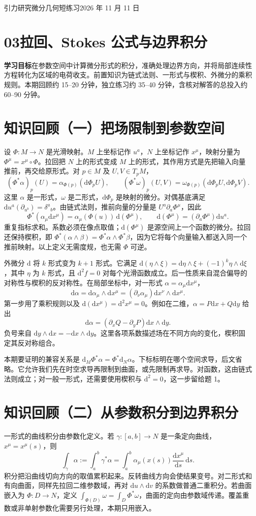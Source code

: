 \documentclass[11pt,a4paper]{article}
\newcommand{\D}{\mathrm d}
\newcommand{\head}[1]{\section*{\color{teal}#1}}
\begin{document}
{\large 引力研究微分几何短练习\hfill 2026 年 11 月 11 日}
\head{03\quad 拉回、Stokes 公式与边界积分}
\textbf{学习目标}\quad 在参数空间中计算微分形式的积分，准确处理边界方向，并将局部连续性方程转化为区域的电荷收支。前置知识为链式法则、一形式与楔积、外微分的乘积规则。本期回顾约 15--20 分钟，独立练习约 35--40 分钟，含核对解答的总投入约 60--90 分钟。

\head{知识回顾（一）\quad 把场限制到参数空间}
设 $\Phi:M\to N$ 是光滑映射。$M$ 上坐标记作 $u^a$，$N$ 上坐标记作 $x^\mu$，映射分量为 $\Phi^\mu=x^\mu\circ\Phi$。拉回把 $N$ 上的形式变成 $M$ 上的形式，其作用方式是先把输入向量推前，再交给原形式。对 $p\in M$ 及 $U,V\in T_pM$，
\[
 (\Phi^*\alpha)_p(U)=\alpha_{\Phi(p)}(\D\Phi_p U),\qquad
 (\Phi^*\omega)_p(U,V)=\omega_{\Phi(p)}(\D\Phi_pU,\D\Phi_pV).
\]
这里 $\alpha$ 是一形式，$\omega$ 是二形式，$\D\Phi_p$ 是映射的微分。对偶基底满足 $\D u^a(\partial_{u^b})=\delta^a{}_b$。由链式法则，推前向量的分量是 $U^a\partial_a\Phi^\mu$，因此
\[
 \Phi^*(\alpha_\mu\D x^\mu)
 =\alpha_\mu(\Phi(u))\,\D(\Phi^\mu),\qquad
 \D(\Phi^\mu)=(\partial_a\Phi^\mu)\D u^a .
\]
重复指标求和。系数必须在像点取值；$\D(\Phi^\mu)$ 是源空间上一个函数的微分。拉回还保持楔积，即 $\Phi^*(\alpha\wedge\beta)=\Phi^*\alpha\wedge\Phi^*\beta$，因为它将每个向量输入都送入同一个推前映射。以上定义无需度规，也无需 $\Phi$ 可逆。

外微分 $\D$ 将 $k$ 形式变为 $k+1$ 形式。它满足 $\D(\eta\wedge\xi)=\D\eta\wedge\xi+(-1)^k\eta\wedge\D\xi$，其中 $\eta$ 为 $k$ 形式，且 $\D^2f=0$ 对每个光滑函数成立。后一性质来自混合偏导的对称性与楔积的反对称性。在局部坐标中，对一形式 $\alpha=\alpha_\mu\D x^\mu$，
\[
 \D\alpha=\D\alpha_\mu\wedge\D x^\mu
 = (\partial_\nu\alpha_\mu)\D x^\nu\wedge\D x^\mu.
\]
第一步用了乘积规则以及 $\D(\D x^\mu)=\D^2x^\mu=0$。例如在二维，$\alpha=P\D x+Q\D y$ 给出
\[
 \D\alpha=(\partial_xQ-\partial_yP)\D x\wedge\D y.
\]
负号来自 $\D y\wedge\D x=-\D x\wedge\D y$。这里各项系数描述场在不同方向的变化，楔积固定其反对称组合。

本期要证明的兼容关系是 $\D_M\Phi^*\alpha=\Phi^*\D_N\alpha$。下标标明在哪个空间求导，后文省略。它允许我们先在时空求导再限制到曲面，或先限制再求导。对函数，这由链式法则成立；对一般一形式，还需要使用楔积与 $\D^2=0$，这一步留给题 1。
\newpage
\head{知识回顾（二）\quad 从参数积分到边界积分}
一形式的曲线积分由参数化定义。若 $\gamma:[a,b]\to N$ 是一条定向曲线，$x^\mu=x^\mu(s)$，则
\[
 \int_\gamma\alpha:=\int_a^b\gamma^*\alpha
 =\int_a^b\alpha_\mu(x(s))\frac{\D x^\mu}{\D s}\,\D s .
\]
积分把沿曲线切向方向的取值累积起来。反转曲线方向会使结果变号。对二形式和有向曲面，同样先拉回二维参数域，再对 $\D u\wedge\D v$ 的系数做普通二重积分。若曲面嵌入为 $\Phi:D\to N$，定义 $\int_{\Phi(D)}\omega=\int_D\Phi^*\omega$，曲面的定向由参数域传递。覆盖重数或非单射参数化需要另行处理，本期只用嵌入。
\end{document}
